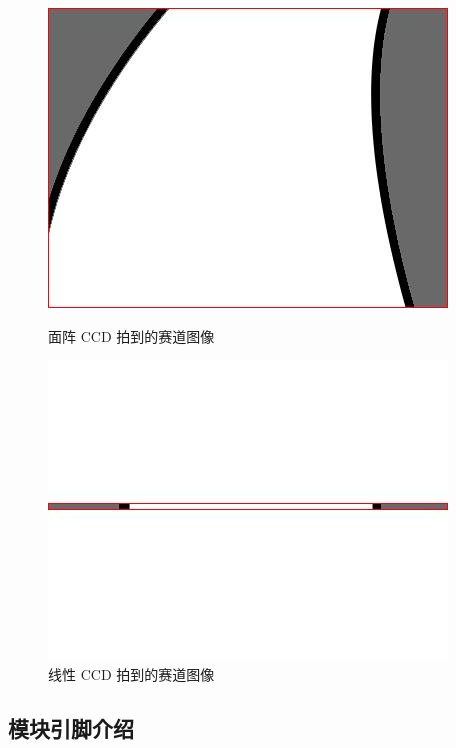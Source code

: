 \begin{figure}[h]
 \centering
 \captionsetup{labelformat=empty}
 \begin{minipage}[t]{0.35\textwidth}
  \centering
  \includegraphics[width=\linewidth]{common_ccd.jpg}
  \caption{\scriptsize{面阵 CCD 拍到的赛道图像}}
 \end{minipage}
 \begin{minipage}[t]{0.35\textwidth}
  \centering
  \includegraphics[width=\linewidth]{linear_ccd.jpg}
  \caption{\scriptsize{线性 CCD 拍到的赛道图像}}
 \end{minipage}
\end{figure}

\subsection{模块引脚介绍}

